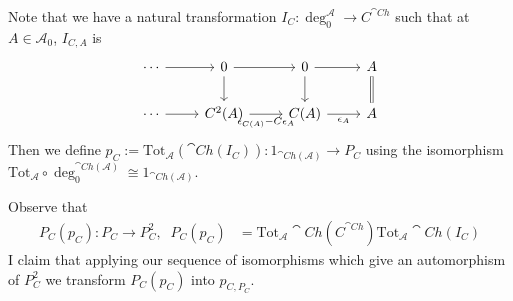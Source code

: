 Note that we have a natural transformation $I_C:\deg_0^\mathcal{A}\to C^{\cat{Ch}}$ such that at $A \in \mathcal{A}_0$, $I_{C,A}$ is 
\[\begin{tikzcd}
	\cdots & 0 & 0 & A \\
	\cdots & {C^2(A)} & {C(A)} & A
	\arrow[from=1-2, to=1-3]
	\arrow[from=1-3, to=1-4]
	\arrow[from=1-1, to=1-2]
	\arrow[Rightarrow, no head, from=1-4, to=2-4]
	\arrow["{\epsilon_A}"', from=2-3, to=2-4]
	\arrow[from=1-3, to=2-3]
	\arrow[from=1-2, to=2-2]
	\arrow[from=2-1, to=2-2]
	\arrow["{\epsilon_{C(A)}-C\epsilon_A}"', from=2-2, to=2-3]
\end{tikzcd}\]
Then we define $p_{C}:= \text{Tot}_\mathcal{A}(\cat{Ch}(I_C)):1_{\cat{Ch}(\mathcal{A})}\to P_C$ using the isomorphism $\text{Tot}_\mathcal{A}\circ \deg_0^{\cat{Ch}(\mathcal{A})}\cong 1_{\cat{Ch}(\mathcal{A})}$. 


Observe that
\begin{align*}
	P_C(p_C):P_C\to P_C^2,\;\; P_C(p_C) &= \text{Tot}_\mathcal{A}\cat{Ch}(C^{\cat{Ch}})\text{Tot}_\mathcal{A}\cat{Ch}(I_C)
\end{align*}
I claim that applying our sequence of isomorphisms which give an automorphism of $P_C^2$ we transform $P_C(p_C)$ into $p_{C,P_C}$. 



